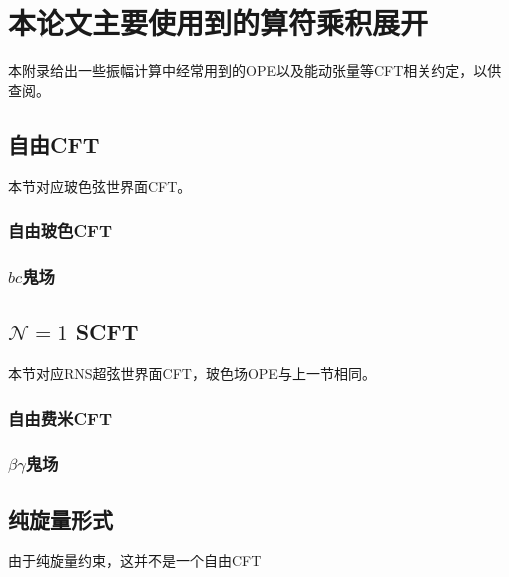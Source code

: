 
\chapter{本论文主要使用到的算符乘积展开}
\label{appendix:A}
本附录给出一些振幅计算中经常用到的OPE以及能动张量等CFT相关约定，以供查阅。
\section{自由CFT}
本节对应玻色弦世界面CFT。
\subsection{自由玻色CFT}

\subsection{$bc$鬼场}
\section{$\mathcal{N}=1$ SCFT}
本节对应RNS超弦世界面CFT，玻色场OPE与上一节相同。
\subsection{自由费米CFT}

\subsection{$\beta\gamma$鬼场}

\section{纯旋量形式}
由于纯旋量约束，这并不是一个自由CFT

